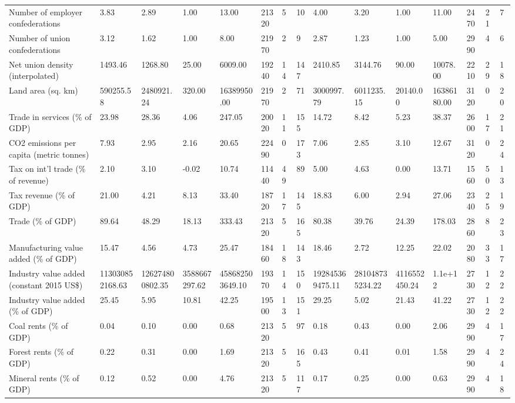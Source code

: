 \begin{longtable}{lllllllllllllll}
Number of employer confederations & 3.83 & 2.89 & 1.00 & 13.00 & 21320 & 5 & 10 & 4.00 & 3.20 & 1.00 & 11.00 & 2470 & 21 & 7\\
Number of union confederations & 3.12 & 1.62 & 1.00 & 8.00 & 21970 & 2 & 9 & 2.87 & 1.23 & 1.00 & 5.00 & 2990 & 4 & 6\\
Net union density (interpolated) & 1493.46 & 1268.80 & 25.00 & 6009.00 & 19240 & 14 & 147 & 2410.85 & 3144.76 & 90.00 & 10078.00 & 2210 & 29 & 18\\
Land area (sq. km) & 590255.58 & 2480921.24 & 320.00 & 16389950.00 & 21970 & 2 & 71 & 3000997.79 & 6011235.15 & 20140.00 & 16386180.00 & 3120 & 0 & 20\\
\addlinespace
Trade in services (\% of GDP) & 23.98 & 28.36 & 4.06 & 247.05 & 20020 & 11 & 155 & 14.72 & 8.42 & 5.23 & 38.37 & 2600 & 17 & 21\\
CO2 emissions per capita (metric tonnes) & 7.93 & 2.95 & 2.16 & 20.65 & 22490 & 0 & 173 & 7.06 & 2.85 & 3.10 & 12.67 & 3120 & 0 & 24\\
Tax on int'l trade (\% of revenue) & 2.10 & 3.10 & -0.02 & 10.74 & 11440 & 49 & 89 & 5.00 & 4.63 & 0.00 & 13.71 & 1560 & 50 & 13\\
Tax revenue (\% of GDP) & 21.00 & 4.21 & 8.13 & 33.40 & 18720 & 17 & 145 & 18.83 & 6.00 & 2.94 & 27.06 & 2340 & 25 & 19\\
Trade (\% of GDP) & 89.64 & 48.29 & 18.13 & 333.43 & 21320 & 5 & 165 & 80.38 & 39.76 & 24.39 & 178.03 & 2860 & 8 & 23\\
\addlinespace
Manufacturing value added (\% of GDP) & 15.47 & 4.56 & 4.73 & 25.47 & 18460 & 18 & 143 & 18.46 & 2.72 & 12.25 & 22.02 & 2080 & 33 & 17\\
Industry value added (constant 2015 US\$) & 113030852168.63 & 126274800802.35 & 3588667297.62 & 458682503649.10 & 19370 & 14 & 150 & 192845369475.11 & 281048735234.22 & 4116552450.24 & 1.1e+12 & 2730 & 12 & 22\\
Industry value added (\% of GDP) & 25.45 & 5.95 & 10.81 & 42.25 & 19500 & 13 & 151 & 29.25 & 5.02 & 21.43 & 41.22 & 2730 & 12 & 22\\
Coal rents (\% of GDP) & 0.04 & 0.10 & 0.00 & 0.68 & 21320 & 5 & 97 & 0.18 & 0.43 & 0.00 & 2.06 & 2990 & 4 & 17\\
Forest rents (\% of GDP) & 0.22 & 0.31 & 0.00 & 1.69 & 21320 & 5 & 165 & 0.43 & 0.41 & 0.01 & 1.58 & 2990 & 4 & 24\\
\addlinespace
Mineral rents (\% of GDP) & 0.12 & 0.52 & 0.00 & 4.76 & 21320 & 5 & 117 & 0.17 & 0.25 & 0.00 & 0.63 & 2990 & 4 & 18\\

\end{longtable}
